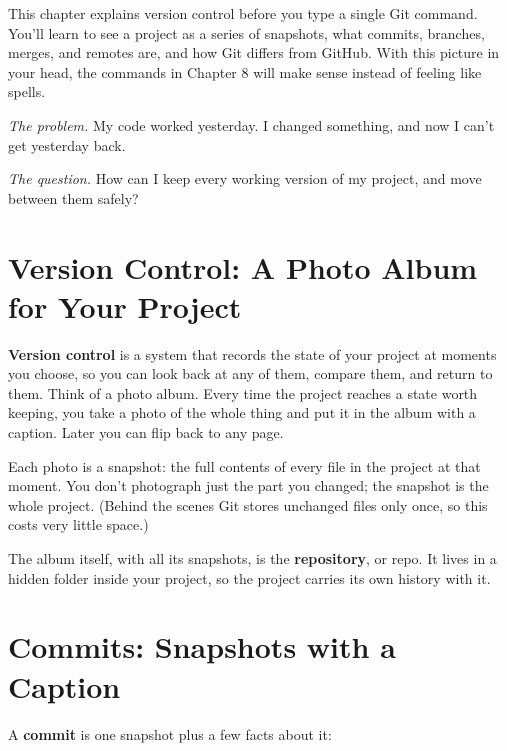 
\begin{chapterintro}

This chapter explains version control before you type a single Git command. You'll learn to see a project as a series of snapshots, what commits, branches, merges, and remotes are, and how Git differs from GitHub. With this picture in your head, the commands in Chapter 8 will make sense instead of feeling like spells.

\end{chapterintro}

\emph{The problem.} My code worked yesterday. I changed something, and now I can't get yesterday back.

\emph{The question.} How can I keep every working version of my project, and move between them safely?

\section{Version Control: A Photo Album for Your Project}\label{04-why-code-needs-a-history:version-control-a-photo-album-for-your-project}

\textbf{Version control} is a system that records the state of your project at moments you choose, so you can look back at any of them, compare them, and return to them. Think of a photo album. Every time the project reaches a state worth keeping, you take a photo of the whole thing and put it in the album with a caption. Later you can flip back to any page.

Each photo is a snapshot: the full contents of every file in the project at that moment. You don't photograph just the part you changed; the snapshot is the whole project. (Behind the scenes Git stores unchanged files only once, so this costs very little space.)

The album itself, with all its snapshots, is the \textbf{repository}, or repo. It lives in a hidden folder inside your project, so the project carries its own history with it.

\section{Commits: Snapshots with a Caption}\label{04-why-code-needs-a-history:commits-snapshots-with-a-caption}

A \textbf{commit} is one snapshot plus a few facts about it:

